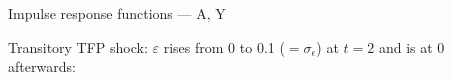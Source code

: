 \documentclass{beamer}
\begin{document}
\begin{frame}{Impulse response functions --- A, Y}

  Transitory TFP shock: $\varepsilon$ rises from 0 to 0.1 ($=\sigma_\epsilon$) at $t=2$ and is at 0 afterwards:
\begin{center}
\vspace{-5mm}
\begin{figure}[h!]
\end{figure}
\end{center}

\end{frame}
\end{document}
